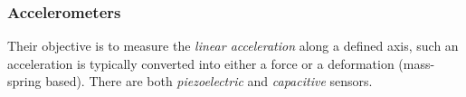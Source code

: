 \subsubsection{Accelerometers}
Their objective is to measure the \textit{linear acceleration} along a defined axis, such an acceleration is typically converted into either a force or a deformation (mass-spring based). There are both \textit{piezoelectric} and \textit{capacitive} sensors.

\begin{figure}
    \centering

\end{figure}

